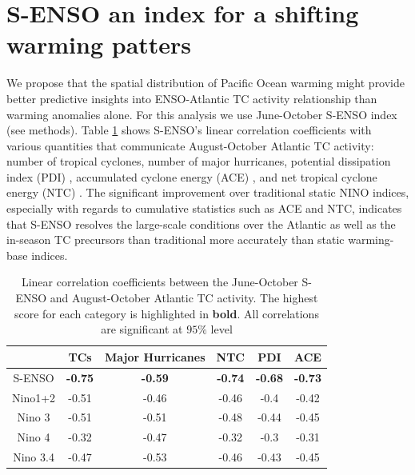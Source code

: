 \section{S-ENSO an index for a shifting warming patters}
We propose that the spatial distribution of Pacific Ocean warming might provide better predictive insights into ENSO-Atlantic TC activity relationship than warming anomalies alone. For this analysis we use June-October S-ENSO index (see methods). Table \ref{ref:lin_corr} shows S-ENSO's linear correlation coefficients with various quantities that communicate August-October Atlantic TC activity: number of tropical cyclones, number of major hurricanes, potential dissipation index (PDI) \cite{emanuel2005a}, accumulated cyclone energy (ACE) \cite{Bell2000}, and net tropical cyclone energy (NTC) \cite{goldenberg2001}. The significant improvement over traditional static NINO indices, especially with regards to cumulative statistics such as ACE and NTC, indicates that S-ENSO resolves the large-scale conditions over the Atlantic as well as the in-season TC precursors than traditional more accurately than static warming-base indices.

\begin{table}
\begin{tabular}{cccccc}
\hline
&TCs & Major Hurricanes & NTC & PDI & ACE\\
\hline
S-ENSO & \textbf{-0.75} & \textbf{-0.59} &\textbf{-0.74} & \textbf{-0.68} & \textbf{-0.73}\\
Nino1+2 & -0.51 & -0.46 & -0.46 & -0.4 & -0.42\\
Nino 3 & -0.51 & -0.51 & -0.48 & -0.44 & -0.45\\
Nino 4 & -0.32 & -0.47 & -0.32 & -0.3 & -0.31\\
Nino 3.4 & -0.47 & -0.53 & -0.46 & -0.43 & -0.45\\
\hline
\end{tabular}
\caption{Linear correlation coefficients between the June-October S-ENSO and August-October Atlantic TC activity. The highest score for each category is highlighted in \textbf{bold}. All correlations are significant at $95\%$ level}
\label{ref:lin_corr}
\end{table}

